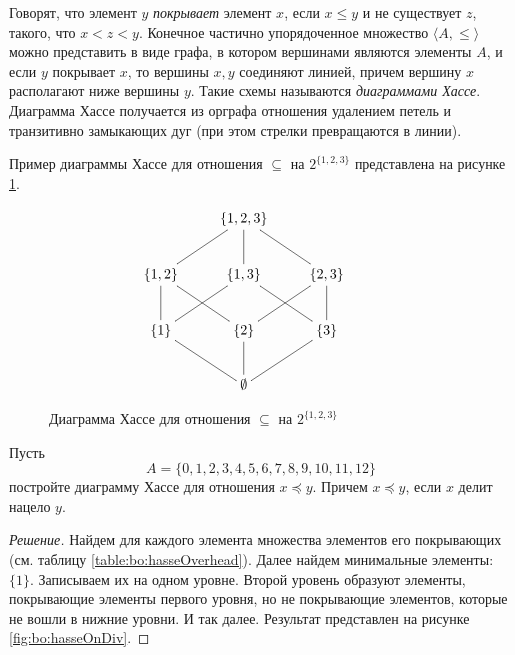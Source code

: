 Говорят, что элемент $y$ \emph{покрывает} элемент $x$, если $x\leq y$ и не существует $z$, такого, что $x<z<y$. Конечное частично упорядоченное множество $\langle A,\leq\rangle$ можно представить в виде графа, в котором вершинами являются элементы $A$, и если $y$ покрывает $x$, то вершины $x,y$ соединяют линией, причем вершину $x$ располагают ниже вершины $y$. Такие схемы называются \emph{диаграммами Хассе}. Диаграмма Хассе получается из орграфа отношения удалением петель и транзитивно замыкающих дуг (при этом стрелки превращаются в линии).

Пример диаграммы Хассе для отношения $\subseteq$ на $2^{\{1,2,3\}}$ представлена на рисунке \ref{fig:bo:hasseOnBoolean}.

\begin{figure}
    \centering
    \[
        {\xymatrix{
            *{} 
                &\{1,2,3\}
                    &*{}
                        \\
            \{1,2\} \ar@{-}[ur]
                &\{1,3\} \ar@{-}[u]
                    &\{2,3\} \ar@{-}[ul]
                        \\
            \{1\} \ar@{-}[u] \ar@{-}[ur]
                &\{2\} \ar@{-}[ul] \ar@{-}[ur]
                    &\{3\} \ar@{-}[u] \ar@{-}[ul]
                        \\
            *{}
                &\emptyset \ar@{-}[ul] \ar@{-}[u] \ar@{-}[ur]
                    &*{}
            b  
                &*{}                 
        }}
    \]
    \caption{Диаграмма Хассе для отношения $\subseteq$ на $2^{\{1,2,3\}}$}
    \label{fig:bo:hasseOnBoolean}
\end{figure}    

\begin{exampl}
    \label{exampl:bo:hasseDivisible}
    Пусть \[A=\{0,1,2,3,4,5,6,7,8,9,10,11,12\}\]
    постройте диаграмму Хассе для отношения $x\preceq y$. Причем $x\preceq y$, если $x$ делит нацело $y$.
\end{exampl}
\begin{proof}[Решение]
    Найдем для каждого элемента множества элементов его покрывающих (см. таблицу \ref{table:bo:hasseOverhead}). Далее найдем минимальные элементы: $\{1\}$. Записываем их на одном уровне. Второй уровень образуют элементы, покрывающие элементы первого уровня, но не покрывающие элементов, которые не вошли в нижние уровни. И так далее. Результат представлен на рисунке \ref{fig:bo:hasseOnDiv}.
\end{proof}

